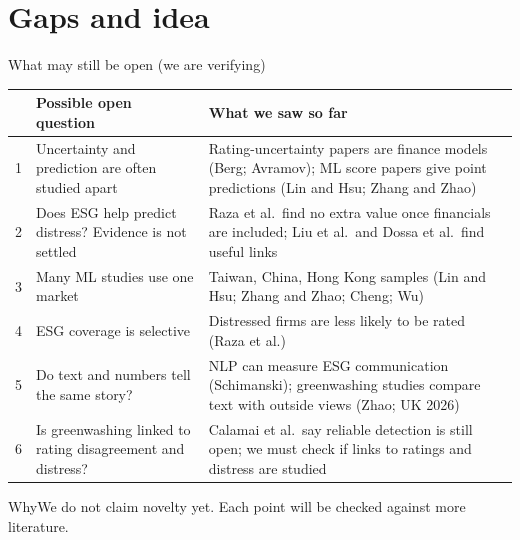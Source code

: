 \documentclass[aspectratio=169,11pt]{beamer}
\newcommand{\why}[1]{\vspace{2pt}\begin{block}{Why}#1\end{block}}
\renewcommand{\arraystretch}{1.25}
\begin{document}
\section{Gaps and idea}
\begin{frame}[t]{What may still be open (we are verifying)}
\scriptsize\renewcommand{\arraystretch}{1.1}
\begin{tabular}{@{}p{0.5cm}p{6.1cm}p{6.6cm}@{}}
\toprule
\rowcolor{softteal}\color{navy} & \color{navy}Possible open question & \color{navy}What we saw so far \\
\midrule
1 & Uncertainty and prediction are often studied apart & Rating-uncertainty papers are finance models (Berg; Avramov); ML score papers give point predictions (Lin and Hsu; Zhang and Zhao) \\
2 & Does ESG help predict distress? Evidence is not settled & Raza et al.\ find no extra value once financials are included; Liu et al.\ and Dossa et al.\ find useful links \\
3 & Many ML studies use one market & Taiwan, China, Hong Kong samples (Lin and Hsu; Zhang and Zhao; Cheng; Wu) \\
4 & ESG coverage is selective & Distressed firms are less likely to be rated (Raza et al.) \\
5 & Do text and numbers tell the same story? & NLP can measure ESG communication (Schimanski); greenwashing studies compare text with outside views (Zhao; UK 2026) \\
6 & Is greenwashing linked to rating disagreement and distress? & Calamai et al.\ say reliable detection is still open; we must check if links to ratings and distress are studied \\
\bottomrule
\end{tabular}
\why{We do not claim novelty yet. Each point will be checked against more literature.}
\end{frame}
\end{document}
